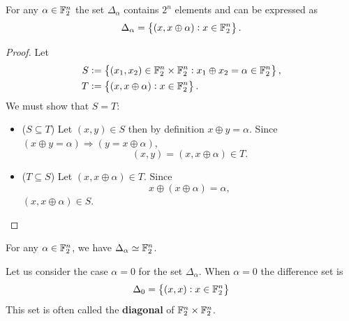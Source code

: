 \documentclass[11pt,openany]{article}
\begin{document}
\begin{probox}{}
\begin{proposition}
	For any $\alpha\in\mathbb{F}_2^n$ the set $\Delta_\alpha$ contains $2^n$ elements and can be expressed as \[
	\Delta_\alpha=\set{(x,x\oplus\alpha):x\in\mathbb{F}_2^n}.
	\]
\end{proposition}
\end{probox}
\begin{proof}
	Let \begin{align*}
		S&:=\set{(x_1,x_2)\in\mathbb{F}_2^n\times\mathbb{F}_2^n:x_1\oplus x_2=\alpha\in\mathbb{F}_2^n}, \\
		T&:=\set{(x,x\oplus\alpha):x\in\mathbb{F}_2^n}.
	\end{align*} We must show that $S=T$:
	\begin{itemize}
		\item[] ($S\subseteq T$) Let $(x,y)\in S$ then by definition $x\oplus y=\alpha$.
		Since $(x\oplus y=\alpha)\Rightarrow (y=x\oplus \alpha)$, \[
		(x,y)=(x,x\oplus \alpha)\in T.
		\]
		\item[]($T\subseteq S$) Let $(x,x\oplus\alpha)\in T$. Since \[
		x\oplus(x\oplus\alpha)=\alpha,
		\] $(x,x\oplus\alpha)\in S$.
	\end{itemize}
\end{proof}
\begin{corbox}{}
\begin{corollary}
	For any $\alpha\in\mathbb{F}_2^n$, we have $\Delta_\alpha\simeq \mathbb{F}_2^n$.
\end{corollary}
\end{corbox}
\begin{remark}
Let us consider the case $\alpha=0$ for the set $\Delta_\alpha$. When $\alpha=0$ the difference set is \[
\Delta_0=\set{(x,x):x\in\mathbb{F}_2^n}
\] This set is often called the \textbf{diagonal} of $\mathbb{F}_2^n\times\mathbb{F}_2^n$.
\end{remark}

\newpage
\end{document}
